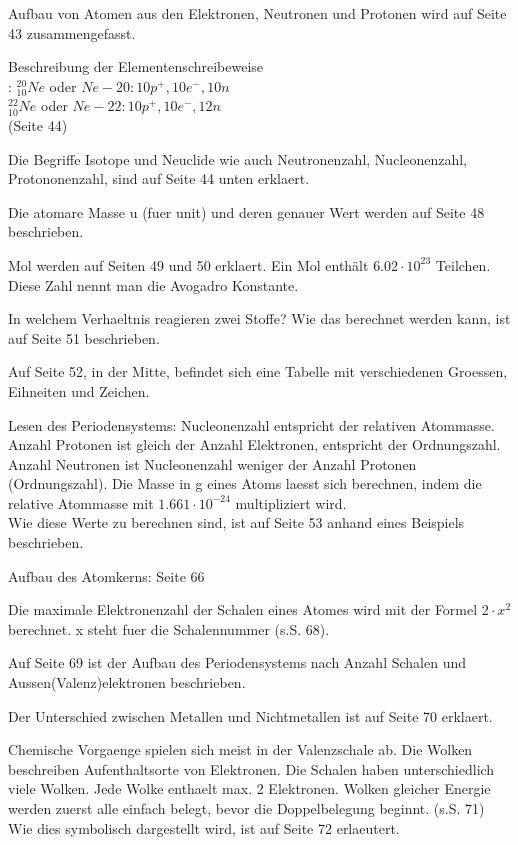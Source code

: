 \documentclass[11pt,paper=a4,final]{scrartcl}
\begin{document}
Aufbau von Atomen aus den Elektronen, Neutronen und Protonen wird auf Seite 43
zusammengefasst.

Beschreibung der Elementenschreibeweise\\: \(^{20}_{10}Ne\) oder \(Ne-20: 10p^+, 10e^-, 10n\)\\
                                         \(^{22}_{10}Ne\) oder \(Ne-22: 10p^+, 10e^-, 12n\)\\
					 (Seite 44)

Die Begriffe Isotope und Neuclide wie auch Neutronenzahl, Nucleonenzahl,
Protononenzahl, sind auf Seite 44 unten erklaert.

Die atomare Masse u (fuer unit) und deren genauer Wert werden auf Seite 48
beschrieben.

Mol werden auf Seiten 49 und 50 erklaert. Ein Mol enth\"alt \(6.02 \cdot
10^{23}\) Teilchen. Diese Zahl nennt man die Avogadro Konstante.

In welchem Verhaeltnis reagieren zwei Stoffe? Wie das berechnet werden kann, ist
auf Seite 51 beschrieben.

Auf Seite 52, in der Mitte, befindet sich eine Tabelle mit verschiedenen
Groessen, Eihneiten und Zeichen.

Lesen des Periodensystems: Nucleonenzahl entspricht der relativen Atommasse.
Anzahl Protonen ist gleich der Anzahl Elektronen, entspricht der Ordnungszahl.
Anzahl Neutronen ist Nucleonenzahl weniger der Anzahl Protonen (Ordnungszahl).
Die Masse in g eines Atoms laesst sich berechnen, indem die relative Atommasse
mit \(1.661 \cdot 10^{-24} \) multipliziert wird.\\ Wie diese Werte zu berechnen
sind, ist auf Seite 53 anhand eines Beispiels beschrieben.

Aufbau des Atomkerns: Seite 66

Die maximale Elektronenzahl der Schalen eines Atomes wird mit der Formel \( 2
\cdot x^2 \) berechnet. x steht fuer die Schalennummer (s.S. 68).

Auf Seite 69 ist der Aufbau des Periodensystems nach Anzahl Schalen und
Aussen(Valenz)elektronen beschrieben.

Der Unterschied zwischen Metallen und Nichtmetallen ist auf Seite 70 erklaert.

Chemische Vorgaenge spielen sich meist in der Valenzschale ab. Die Wolken
beschreiben Aufenthaltsorte von Elektronen. Die Schalen haben unterschiedlich
viele Wolken. Jede Wolke enthaelt max. 2 Elektronen. Wolken gleicher Energie
werden zuerst alle einfach belegt, bevor die Doppelbelegung beginnt. (s.S. 71)
Wie dies symbolisch dargestellt wird, ist auf Seite 72 erlaeutert.
\end{document}
